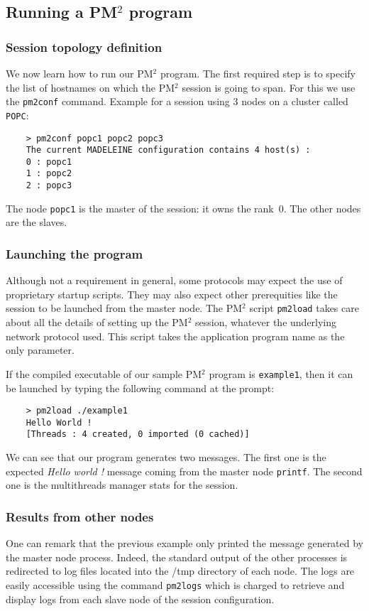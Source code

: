\documentclass[a4paper,11pt]{report}
\def\pm2{PM$^2$\xspace}
\begin{document}
\subsection{Running a \pm2 program}
\subsubsection{Session topology definition}
We now learn how to run our \pm2 program. The first required step is
to specify the list of hostnames on which the \pm2 session is going to
span. For this we use the \texttt{pm2conf} command. Example for a
session using 3 nodes on a cluster called \texttt{POPC}:
\begin{verbatim}
    > pm2conf popc1 popc2 popc3
    The current MADELEINE configuration contains 4 host(s) :
    0 : popc1
    1 : popc2
    2 : popc3
\end{verbatim}
The node \texttt{popc1} is the master of the session: it owns the
rank~0. The other nodes are the slaves. 

\subsubsection{Launching the program}
Although not a requirement in general, some protocols may expect the
use of proprietary startup scripts. They may also expect other
prerequities like the session to be launched from the master node. The
\pm2 script \texttt{pm2load} takes care about all the details of
setting up the \pm2 session, whatever the underlying network protocol
used. This script takes the application program name as the only
parameter.

If the compiled executable of our sample \pm2 program is
\texttt{example1}, then it can be launched by typing the following
command at the prompt:
\begin{verbatim}
    > pm2load ./example1
    Hello World !
    [Threads : 4 created, 0 imported (0 cached)]
\end{verbatim}
We can see that our program generates two messages. The first one is the
expected \emph{Hello world !} message coming from the master node
\texttt{printf}. The second one is the multithreads manager stats for
the session.

\subsubsection{Results from other nodes}
One can remark that the previous example only printed the message
generated by the master node process. Indeed, the standard output of
the other processes is redirected to log files located into the /tmp
directory of each node. The logs are easily accessible using the
command \texttt{pm2logs} which is charged to retrieve and display logs
from each slave node of the session configuration.
\end{document}
